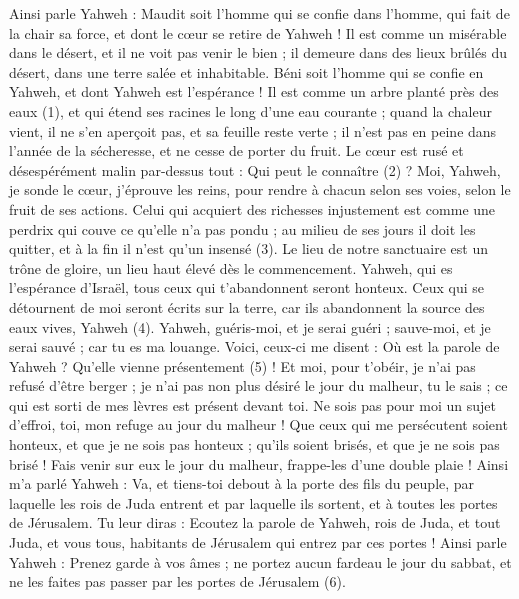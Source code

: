 \begin{multicols}{2}
Ainsi parle Yahweh : Maudit soit l'homme qui se confie dans l'homme, qui fait de la chair sa force, et dont le cœur se retire de Yahweh !
Il est comme un misérable dans le désert, et il ne voit pas venir le bien ; il demeure dans des lieux brûlés du désert, dans une terre salée et inhabitable.
Béni soit l'homme qui se confie en Yahweh, et dont Yahweh est l’espérance !
Il est comme un arbre planté près des eaux\FTNT{} (1), et qui étend ses racines le long d'une eau courante ; quand la chaleur vient, il ne s'en aperçoit pas, et sa feuille reste verte ; il n’est pas en peine dans l'année de la sécheresse, et ne cesse de porter du fruit.
Le cœur est rusé et désespérément malin par-dessus tout : Qui peut le connaître\FTNT{} (2) ?
Moi, Yahweh, je sonde le cœur, j’éprouve les reins, pour rendre à chacun selon ses voies, selon le fruit de ses actions.
Celui qui acquiert des richesses injustement est comme une perdrix qui couve ce qu'elle n'a pas pondu ; au milieu de ses jours il doit les quitter, et à la fin il n’est qu’un insensé\FTNT{} (3).
Le lieu de notre sanctuaire est un trône de gloire, un lieu haut élevé dès le commencement.
Yahweh, qui es l'espérance d'Israël, tous ceux qui t'abandonnent seront honteux. Ceux qui se détournent de moi seront écrits sur la terre, car ils abandonnent la source des eaux vives, Yahweh\FTNT{} (4).
Yahweh, guéris-moi, et je serai guéri ; sauve-moi, et je serai sauvé ; car tu es ma louange.
Voici, ceux-ci me disent : Où est la parole de Yahweh ? Qu’elle vienne présentement\FTNT{} (5) !
Et moi, pour t’obéir, je n’ai pas refusé d’être berger ; je n’ai pas non plus désiré le jour du malheur, tu le sais ; ce qui est sorti de mes lèvres est présent devant toi.
Ne sois pas pour moi un sujet d’effroi, toi, mon refuge au jour du malheur !
Que ceux qui me persécutent soient honteux, et que je ne sois pas honteux ; qu'ils soient brisés, et que je ne sois pas brisé ! Fais venir sur eux le jour du malheur, frappe-les d'une double plaie !
Ainsi m’a parlé Yahweh : Va, et tiens-toi debout à la porte des fils du peuple, par laquelle les rois de Juda entrent et par laquelle ils sortent, et à toutes les portes de Jérusalem.
Tu leur diras : Ecoutez la parole de Yahweh, rois de Juda, et tout Juda, et vous tous, habitants de Jérusalem qui entrez par ces portes !
Ainsi parle Yahweh : Prenez garde à vos âmes ; ne portez aucun fardeau le jour du sabbat, et ne les faites pas passer par les portes de Jérusalem\FTNT{} (6).

\end{multicols}
